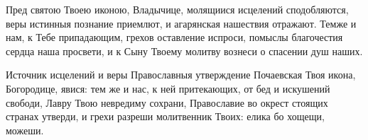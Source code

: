 \mychapterending

\begin{mymulticols}



Пред святою Твоею иконою, Владычице, молящиися исцелений сподобляются, веры истинныя познание приемлют, и агарянская нашествия отражают. Темже и нам, к Тебе припадающим, грехов оставление испроси, помыслы благочестия сердца наша просвети, и к Сыну Твоему молитву вознеси о спасении душ наших.


Источник исцелений и веры Православныя утверждение Почаевская Твоя икона, Богородице, явися: тем же и нас, к ней притекающих, от бед и искушений свободи, Лавру Твою невредиму сохрани, Православие во окрест стоящих странах утверди, и грехи разреши молитвенник Твоих: елика бо хощещи, можеши.



\end{mymulticols}
